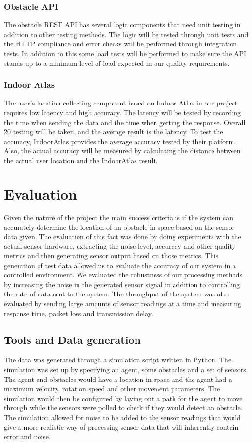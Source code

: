 \documentclass[prodmode,acmtosem]{acmsmall} %
\begin{document}
\subsubsection{Obstacle API}
The obstacle REST API has several logic components that need unit testing in addition to other testing methods. The logic will be tested through unit tests and the HTTP compliance and error checks will be performed through integration tests. In addition to this some load tests will be performed to make sure the API stands up to a minimum level of load expected in our quality requirements.

\subsubsection{Indoor Atlas}
The user's location collecting component based on Indoor Atlas in our project requires low latency and high accuracy. The latency will be tested by recording the time when sending the data and the time when getting the response. Overall 20 testing will be taken, and the average result is the latency. To test the accuracy, IndoorAtlas provides the average accuracy tested by their platform. Also, the actual accuracy will be measured by calculating the distance between the actual user location and the IndoorAtlas result.

\section{Evaluation}
Given the nature of the project the main success criteria is if the system can accurately determine the location of an obstacle in space based on the sensor data given. The evaluation of this fact was done by doing experiments with the actual sensor hardware, extracting the noise level, accuracy and other quality metrics and then generating sensor output based on those metrics. This generation of test data allowed us to evaluate the accuracy of our system in a controlled environment. We evaluated the robustness of our processing methods by increasing the noise in the generated sensor signal in addition to controlling the rate of data sent to the system. The throughput of the system was also evaluated by sending large amounts of sensor readings at a time and measuring response time, packet loss and transmission delay.

\subsection{Tools and Data generation}
The data was generated through a simulation script written in Python. The simulation was set up by specifying an agent, some obstacles and a set of sensors. The agent and obstacles would have a location in space and the agent had a maximum velocity, rotation speed and other movement parameters. The simulation would then be configured by laying out a path for the agent to move through while the sensors were polled to check if they would detect an obstacle. The simulation allowed for noise to be added to the sensor readings that would give a more realistic way of processing sensor data that will inherently contain error and noise.
\end{document}
